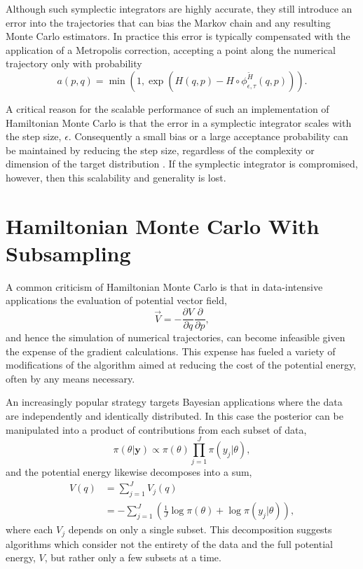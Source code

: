 \documentclass{article}
\begin{document}
Although such symplectic integrators are highly accurate, they still introduce an
error into the trajectories that can bias the Markov chain and any resulting
Monte Carlo estimators.  In practice this error is typically compensated with
the application of a Metropolis correction, accepting a point along the numerical 
trajectory only with probability
%
\begin{equation*}
a (p, q) = \min \left(1, 
\exp \! \left( H (q, p) - H \circ \phi^{\widetilde{H}}_{\epsilon, \tau} (q, p) \right) \right).
\end{equation*}

A critical reason for the scalable performance of such an implementation of 
Hamiltonian Monte Carlo is that the error in a symplectic integrator scales 
with the step size, $\epsilon$.  Consequently a small bias or a large acceptance 
probability can be maintained by reducing the step size, regardless of the complexity
or dimension of the target distribution \cite{BetancourtEtAl:2014b}.  If the symplectic
integrator is compromised, however, then this scalability and generality is lost.

\section{Hamiltonian Monte Carlo With Subsampling}

A common criticism of Hamiltonian Monte Carlo is that in data-intensive applications 
the evaluation of potential vector field,
%
\begin{equation*}
\vec{V} = - \frac{ \partial V }{ \partial q } \frac{ \partial }{ \partial p},
\end{equation*}
%
and hence the simulation of numerical trajectories, can become infeasible given the 
expense of the gradient calculations.  This expense has fueled a variety of modifications 
of the algorithm aimed at reducing the cost of the potential energy, often by any means 
necessary.

An increasingly popular strategy targets Bayesian applications where the data are 
independently and identically distributed.  In this case the posterior can be manipulated
into a product of contributions from each subset of data, 
%
\begin{equation*}
\pi \! \left( \theta | \mathbf{y} \right) \propto \pi \! \left( \theta \right) 
\prod_{j = 1}^{J} \pi \! \left( y_{j} | \theta \right),
\end{equation*}
%
and the potential energy likewise decomposes into a sum,
%
\begin{align*}
V (q) 
&= \sum_{j = 1}^{J} V_{j} (q)
\\
&= 
- \sum_{j = 1}^{J} \left( \frac{1}{J} \log \pi \! \left( \theta \right) 
+ \log \pi \! \left( y_{j} | \theta \right) \right),
\end{align*}
%
where each $V_{j}$ depends on only a single subset.  This decomposition 
suggests algorithms which consider not the entirety of the data and the full potential
energy, $V$, but rather only a few subsets at a time.
\end{document}
